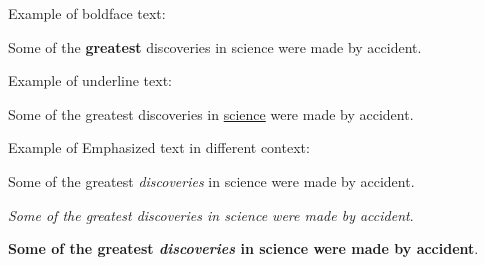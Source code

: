 \documentclass{article}
\begin{document}
 Example of boldface text:
 
 Some of the \textbf{greatest} discoveries in science were made by accident.
 
 \vspace{1.5cm}
 
 Example of underline text:
 
 Some of the greatest discoveries in \underline{science} were made by accident. 
 
 \vspace{1 cm}
 
 Example of Emphasized text in different context:
 
 \vspace{.5cm}
 Some of the greatest \emph{discoveries} in science were made by accident.
 
 \textit{Some of the greatest \emph{discoveries} in science were made by accident}.
 
 \textbf{Some of the greatest \emph{discoveries} in science were made by accident}.
 
 
 
 
\end{document}
